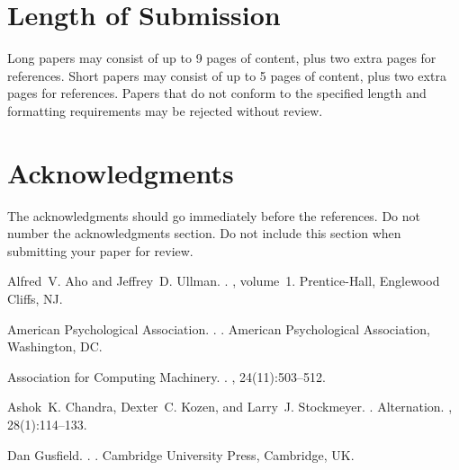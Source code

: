 \documentclass[11pt]{article}
\begin{document}
\section{Length of Submission}
\label{sec:length}

Long papers may consist of up to 9 pages of content, plus two extra
pages for references. Short papers may consist of up to 5 pages of
content, plus two extra pages for references.  Papers that do not
conform to the specified length and formatting requirements may be
rejected without review.



\section*{Acknowledgments}

The acknowledgments should go immediately before the references.  Do
not number the acknowledgments section. Do not include this section
when submitting your paper for review.

%
%

\begin{thebibliography}{}

Alfred~V. Aho and Jeffrey~D. Ullman.
.
, volume~1.
\newblock Prentice-{Hall}, Englewood Cliffs, NJ.

{American Psychological Association}.
.
.
\newblock American Psychological Association, Washington, DC.

{Association for Computing Machinery}.
.
, 24(11):503--512.

Ashok~K. Chandra, Dexter~C. Kozen, and Larry~J. Stockmeyer.
.
\newblock Alternation.
,
  28(1):114--133.

Dan Gusfield.
.
.
\newblock Cambridge University Press, Cambridge, UK.

\end{thebibliography}
\end{document}
